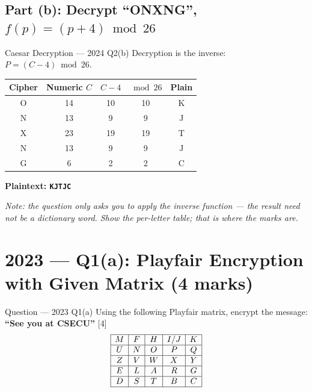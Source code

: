 \documentclass[12pt,a4paper]{article}
\begin{document}
\subsection{Part (b): Decrypt ``ONXNG'', $f(p)=(p+4)\bmod 26$}
\begin{solbox}{Caesar Decryption --- 2024 Q2(b)}
Decryption is the inverse: $P=(C-4)\bmod 26$.
\begin{center}
\renewcommand{\arraystretch}{1.3}
\begin{tabular}{c|c|c|c|c}
\toprule
Cipher & Numeric $C$ & $C-4$ & $\bmod 26$ & Plain \\
\midrule
O & 14 & 10 & 10 & K \\
N & 13 & 9  & 9  & J \\
X & 23 & 19 & 19 & T \\
N & 13 & 9  & 9  & J \\
G & 6  & 2  & 2  & C \\
\bottomrule
\end{tabular}
\end{center}
\textbf{Plaintext: \texttt{KJTJC}}

\vspace{0.3em}
\noindent\textit{Note: the question only asks you to apply the inverse function --- the result need not be a dictionary word. Show the per-letter table; that is where the marks are.}
\end{solbox}

\newpage
\section{2023 --- Q1(a): Playfair Encryption with Given Matrix (4 marks)}

\begin{qbox}{Question --- 2023 Q1(a)}
Using the following Playfair matrix, encrypt the message: \textbf{``See you at CSECU''} \hfill [4]
\[
\begin{array}{|c|c|c|c|c|}
\hline
M & F & H & I/J & K \\\hline
U & N & O & P & Q \\\hline
Z & V & W & X & Y \\\hline
E & L & A & R & G \\\hline
D & S & T & B & C \\\hline
\end{array}
\]
\end{qbox}
\end{document}
